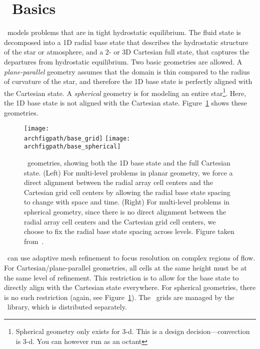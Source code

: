 \section{\maestro\ Basics}

\maestro\ models problems that are in tight hydrostatic equilibrium.
The fluid state is decomposed into a 1D radial base state that
describes the hydrostatic structure of the star or atmosphere, and a
2- or 3D Cartesian full state, that captures the departures from
hydrostatic equilibrium.  Two basic geometries are allowed.  A {\em
  plane-parallel} geometry assumes that the domain is thin compared to
the radius of curvature of the star, and therefore the 1D base state
is perfectly aligned with the Cartesian state.  A {\em spherical}
geometry is for modeling an entire star\footnote{Spherical geometry
  only exists for 3-d. This is a design decision---convection is 3-d.
  You can however run as an octant}.  Here, the 1D base state is not
aligned with the Cartesian state.  Figure~\ref{fig:base_state} shows
these geometries.

\begin{figure}[tb]
\centering
\texttt{[image: \\archfigpath/base\_grid]} \hspace{0.5in}
\texttt{[image: \\archfigpath/base\_spherical]}
\caption[\maestro\ geometries]{\label{fig:base_state} \maestro\ geometries, showing both the
  1D base state and the full Cartesian state.  (Left) For multi-level
  problems in planar geometry, we force a direct alignment between the
  radial array cell centers and the Cartesian grid cell centers by
  allowing the radial base state spacing to change with space and
  time.  (Right) For multi-level problems in spherical geometry, since
  there is no direct alignment between the radial array cell centers
  and the Cartesian grid cell centers, we choose to fix the radial
  base state spacing across levels. Figure taken
  from~\cite{multilevel}.}
\end{figure}


\maestro\ can use adaptive mesh refinement to focus resolution on
complex regions of flow.  For Cartesian/plane-parallel geometries, all
cells at the same height must be at the same level of refinement.
This restriction is to allow for the base state to directly align with
the Cartesian state everywhere.  For spherical geometries, there is no
such restriction (again, see Figure~\ref{fig:base_state}).
The \maestro\ grids are managed by the \boxlib\ library, which is
distributed separately.



